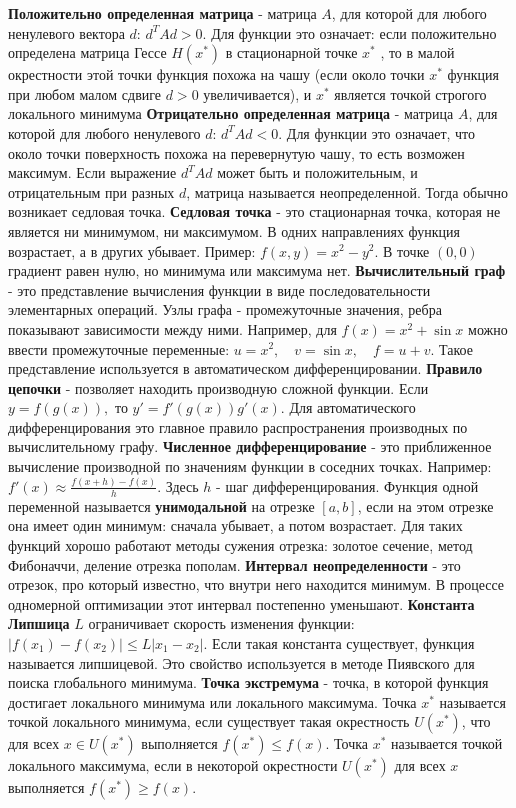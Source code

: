 \documentclass[12pt,a4paper]{article}
\begin{document}
\textbf{Положительно определенная матрица} - матрица $A$, для которой для любого ненулевого вектора $d$: $d^TAd>0.$
Для функции это означает: если положительно определена матрица Гессе $H(x^*)$ в стационарной точке $x^*$ , то в малой окрестности этой точки функция похожа на чашу (если около точки $x^*$ функция при любом малом сдвиге $d > 0$ увеличивается), и $x^*$ является точкой строгого локального минимума
\textbf{Отрицательно определенная матрица} - матрица $A$, для которой для любого ненулевого $d$: $d^TAd<0.$
Для функции это означает, что около точки поверхность похожа на перевернутую чашу, то есть возможен максимум.
Если выражение $d^TAd$ может быть и положительным, и отрицательным при разных $d$, матрица называется неопределенной. Тогда обычно возникает седловая точка.
\textbf{Седловая точка} - это стационарная точка, которая не является ни минимумом, ни максимумом. В одних направлениях функция возрастает, а в других убывает.
Пример: $f(x,y)=x^2-y^2.$
В точке $(0,0)$ градиент равен нулю, но минимума или максимума нет.
\textbf{Вычислительный граф} - это представление вычисления функции в виде последовательности элементарных операций. Узлы графа - промежуточные значения, ребра показывают зависимости между ними.
Например, для $f(x)=x^2+\sin x$
можно ввести промежуточные переменные: $u=x^2,\quad v=\sin x,\quad f=u+v.$
Такое представление используется в автоматическом дифференцировании.
\textbf{Правило цепочки} - позволяет находить производную сложной функции. Если $y=f(g(x)),$
то $y'=f'(g(x))g'(x).$
Для автоматического дифференцирования это главное правило распространения производных по вычислительному графу.
\textbf{Численное дифференцирование} - это приближенное вычисление производной по значениям функции в соседних точках.
Например: $f'(x)\approx \frac{f(x+h)-f(x)}{h}.$
Здесь $h$ - шаг дифференцирования.
Функция одной переменной называется \textbf{унимодальной} на отрезке $[a,b]$, если на этом отрезке она имеет один минимум: сначала убывает, а потом возрастает.
Для таких функций хорошо работают методы сужения отрезка: золотое сечение, метод Фибоначчи, деление отрезка пополам.
\textbf{Интервал неопределенности} - это отрезок, про который известно, что внутри него находится минимум. В процессе одномерной оптимизации этот интервал постепенно уменьшают.
\textbf{Константа Липшица} $L$ ограничивает скорость изменения функции: $|f(x_1)-f(x_2)|\le L|x_1-x_2|.$
Если такая константа существует, функция называется липшицевой. Это свойство используется в методе Пиявского для поиска глобального минимума.
\textbf{Точка экстремума} - точка, в которой функция достигает локального минимума или локального максимума. Точка $x^*$ называется точкой локального минимума, если существует такая окрестность $U(x^*)$, что для всех $x \in U(x^*)$ выполняется $f(x^*) \le f(x).$ Точка $x^*$ называется точкой локального максимума, если в некоторой окрестности $U(x^*)$ для всех $x$ выполняется $f(x^*) \ge f(x).$
\end{document}
